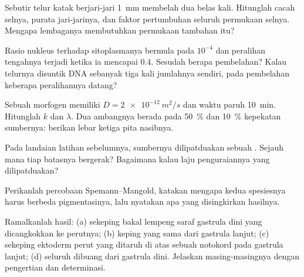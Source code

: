 \begin{exercise}[$\star\star$]\label{exo:b2:vertebrate-development:5}
Sebutir telur katak berjari-jari \qty{1}{mm} membelah dua belas kali.
Hitunglah cacah selnya, purata jari-jarinya, dan faktor
pertumbuhan seluruh permukaan selnya. Mengapa lembaganya membutuhkan
permukaan tambahan itu?
\end{exercise}

\begin{exercise}[$\star\star$]\label{exo:b2:vertebrate-development:6}
Rasio nukleus terhadap sitoplasmanya bermula pada $10^{-4}$ dan
peralihan  tengahnya terjadi ketika ia mencapai $0.4$. Sesudah
berapa pembelahan? Kalau telurnya disuntik DNA sebanyak tiga kali
jumlahnya sendiri, pada pembelahan keberapa peralihannya datang?
\end{exercise}

\begin{exercise}[$\star\star$]\label{exo:b2:vertebrate-development:7}
Sebuah morfogen memiliki $D = \qty{2e-12}{m^2/s}$ dan waktu paruh
\qty{10}{min}. Hitunglah $k$ dan $\lambda$. Dua ambangnya berada pada
\qty{50}{\%} dan \qty{10}{\%} kepekatan sumbernya: berikan lebar
ketiga pita nasibnya.
\end{exercise}

\begin{exercise}[$\star\star$]\label{exo:b2:vertebrate-development:8}
Pada landaian latihan sebelumnya, sumbernya dilipatduakan sebuah
. Sejauh mana tiap batasnya bergerak? Bagaimana kalau laju
penguraiannya yang dilipatduakan?
\end{exercise}

\begin{exercise}[$\star\star$]\label{exo:b2:vertebrate-development:9}
Perikanlah percobaan Spemann--Mangold, katakan mengapa kedua spesiesnya
harus berbeda pigmentasinya, lalu nyatakan apa yang disingkirkan
hasilnya.
\end{exercise}

\begin{exercise}[$\star\star\star$]\label{exo:b2:vertebrate-development:10}
Ramalkanlah hasil: (a) sekeping bakal lempeng saraf gastrula dini yang
dicangkokkan ke perutnya; (b) keping yang sama dari gastrula lanjut;
(c) sekeping ektoderm perut yang ditaruh di atas sebuah notokord pada
gastrula lanjut; (d) seluruh  dibuang dari gastrula dini.
Jelaskan masing-masingnya dengan pengertian  dan
determinasi.
\end{exercise}

